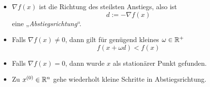 \documentclass[
]{mycourse}
\begin{document}
\begin{seg}
	\begin{itemize}
		\item
			$\nabla f(x)$ ist die Richtung des steilsten Anstiegs, also ist
			\[
				d := -\nabla f(x)
			\]
			eine „\emph{Abstiegsrichtung}“.
		\item
			Falls $\nabla f(x) \neq 0$, dann gilt für genügend kleines $\omega \in \mathbb{R}^+$
			\[
				f(x + \omega d) < f(x)
			\]
		\item
			Falls $\nabla f(x) = 0$, dann wurde $x$ als stationärer Punkt gefunden.
		\item
			Zu $x^{(0)} \in \mathbb{R}^n$ gehe wiederholt kleine Schritte in Abstiegsrichtung.
	\end{itemize}
\end{seg}
\end{document}
